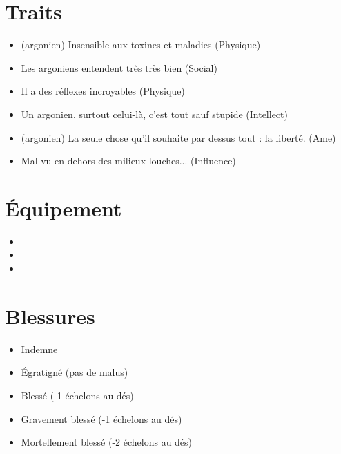 \documentclass{Tamriel}
\begin{document}
\begin{multicols*}{2}
\raggedcolumns
    
        \section*{Traits}

        \begin{itemize}
        \item (argonien) Insensible aux toxines et maladies (Physique)
        \item Les argoniens entendent très très bien (Social)
        \item Il a des réflexes incroyables (Physique)
        \item Un argonien, surtout celui-là, c'est tout sauf stupide (Intellect)
        \item (argonien) La seule chose qu'il souhaite par dessus tout : la liberté. (Ame)
        \item Mal vu en dehors des milieux louches... (Influence)
        \end{itemize}
        
        \section*{Équipement}

        \begin{itemize}
        \item 
        \item 
        \item 
        \end{itemize}
        
        \section*{Blessures}

	\begin{itemize}
	\item Indemne
	\item Égratigné (pas de malus)
	\item Blessé (-1 échelons au dés)
	\item Gravement blessé (-1 échelons au dés)
	\item Mortellement blessé (-2 échelons au dés)
        \end{itemize}
        
        \columnbreak
        

\end{multicols*}
\end{document}
